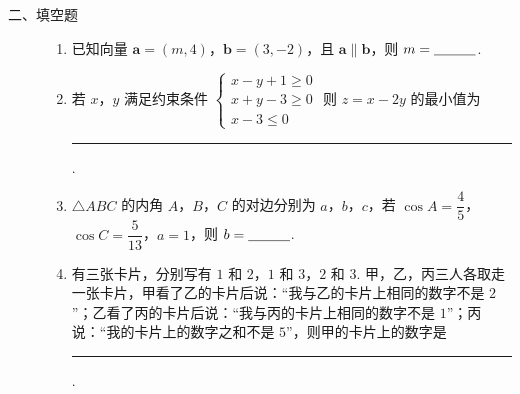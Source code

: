 \begin{description}

    \item[二、填空题]

    \begin{enumerate}[leftmargin=5pt]

      \addtocounter{enumi}{+12}

        \item 已知向量 \(\bm{a}=(m,4)\)，\(\bm{b}=(3,-2)\)，且 \(\bm{a}\parallel\bm{b}\)，则 \(m=\rule[-0.3ex]{3em}{0.4pt}\).

        \item 若 \(x\)，\(y\) 满足约束条件
\(\begin{cases}
x-y+1\ge 0\\
x+y-3\ge 0\\
x-3\le 0
\end{cases}\)
则 \(z=x-2y\) 的最小值为\rule[-0.3ex]{3em}{0.4pt}.

        \item \(\triangle ABC\) 的内角 \(A\)，\(B\)，\(C\) 的对边分别为 \(a\)，\(b\)，\(c\)，若 \(\cos A=\dfrac45\)，\(\cos C=\dfrac{5}{13}\)，\(a=1\)，则 \(b=\rule[-0.3ex]{3em}{0.4pt}\).

        \item 有三张卡片，分别写有 \(1\) 和 \(2\)，\(1\) 和 \(3\)，\(2\) 和 \(3\). 甲，乙，丙三人各取走一张卡片，甲看了乙的卡片后说：“我与乙的卡片上相同的数字不是 \(2\)”；乙看了丙的卡片后说：“我与丙的卡片上相同的数字不是 \(1\)”；丙说：“我的卡片上的数字之和不是 \(5\)”，则甲的卡片上的数字是\rule[-0.3ex]{3em}{0.4pt}.

    \end{enumerate}

\end{description}

